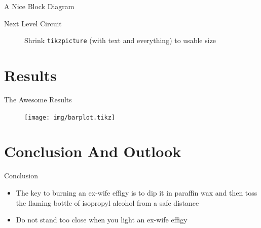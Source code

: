 \documentclass[en,navbaroff]{sdqbeamer} %
\begin{document}
\begin{frame}[t]{A Nice Block Diagram}
\end{frame}

\begin{frame}[t]{Next Level Circuit}
\begin{figure}
\centering
{}
\caption{Shrink \texttt{tikzpicture} (with text and everything) to usable size}
\end{figure}
\end{frame}

\section{Results}
\begin{frame}[t]{The Awesome Results}
\begin{figure}
\centering
\texttt{[image: img/barplot.tikz]}
\end{figure}
\end{frame}


\section{Conclusion And Outlook}
\begin{frame}[t]{Conclusion}
\begin{itemize}
\item The key to burning an ex-wife effigy is to dip it in paraffin wax and then toss the flaming bottle of isopropyl alcohol from a safe distance
\item Do not stand too close when you light an ex-wife effigy
\end{itemize}
\end{frame}
\end{document}
